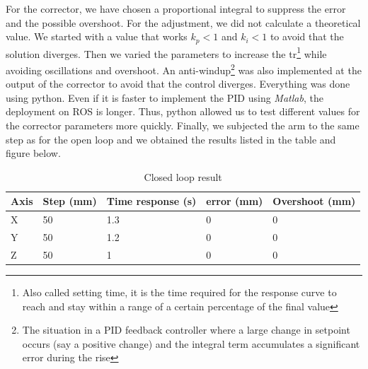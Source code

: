 For the corrector, we have chosen a proportional integral to suppress the error and the possible overshoot. For the adjustment, we did not calculate a theoretical value. We started with a value that works $k_p\less 1$ and $k_i\less 1$ to avoid that the solution diverges. Then we varied the parameters to increase the \gls{tr}\footnote{Also called setting time, it is the time required for the response curve to reach and stay within a range of a certain percentage of the final value} while avoiding oscillations and overshoot. An anti-\gls{windup}\footnote{The situation in a PID feedback controller where a large change in setpoint occurs (say a positive change) and the integral term accumulates a significant error during the rise} was also implemented at the output of the corrector to avoid that the control diverges. Everything was done using python. Even if it is faster to implement the PID using \textit{Matlab}, the deployment on ROS is longer. Thus, python allowed us to test different values for the corrector parameters more quickly. Finally, we subjected the arm to the same step as for the open loop and we obtained the results listed in the table and figure below.
\begin{table}[ht]
    \centering
    \begin{tabular}{|p{1cm} | p{2.3cm} | p{3.5cm} | p{2.3cm}| p{3.3cm} |} 
        \hline
        \textbf{Axis} & \textbf{Step (mm)} &\textbf{Time response (s)} & \textbf{error (mm)} & \textbf{Overshoot (mm)}\\ [0.3ex]
        \hline
        X & 50 & 1.3 & 0 & 0 \\ 
        \hline
        Y & 50 & 1.2 & 0 & 0 \\ 
        \hline
        Z & 50 & 1 & 0 & 0 \\ 
        \hline
    \end{tabular}
    \caption{Closed loop result}
\end{table}
\FloatBarrier

